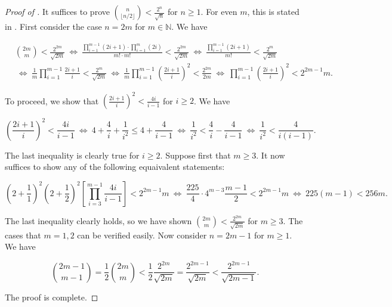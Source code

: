 \documentclass{toc}
\begin{document}
\begin{proof}[Proof of ]
				It suffices to prove $\binom{n}{\lfloor n/2 \rfloor} < \frac{2^n}{\sqrt{n}}$ for $n \ge 1$.
				For even $m$, this is stated in \cite[2.6.2 Proposition]{invitation}.
				First consider the case $n = 2m$ for $m\in \mathbb{N}$. We have
				\begin{linenomath}\begin{equation*}
						\begin{aligned}
							& \binom{2m}{m} < \frac{2^{2m}}{\sqrt{2m}}
							~\iff~ \frac{\prod_{i=1}^{m-1} (2i + 1) \cdot \prod_{i=1}^m (2i)}{m!\cdot m!} < \frac{2^{2m}}{\sqrt{2m}}
							~\iff~ \frac{\prod_{i=1}^{m-1} (2i + 1)}{m!} < \frac{2^m}{\sqrt{2m}} \\
							& ~\iff~ \frac{1}{m} \prod_{i=1}^{m-1} \frac{2i + 1}{i} < \frac{2^m}{\sqrt{2m}}
							~\iff~ \frac{1}{m}\prod_{i=1}^{m-1} \left(\frac{2i + 1}{i}\right)^2 < \frac{2^{2m}}{2m}
							~\iff~ \prod_{i=1}^{m-1} \left(\frac{2i + 1}{i}\right)^2 < 2^{2m - 1}m.
						\end{aligned}
				\end{equation*}\end{linenomath}
				To proceed, we show that $\left(\frac{2i + 1}{i}\right)^2 < \frac{4i}{i - 1}$ for $i \ge 2$.
				We have
				\begin{linenomath}\begin{equation*}
						\left(\frac{2i + 1}{i}\right)^2 < \frac{4i}{i - 1}
						~\iff~ 4 + \frac{4}{i} + \frac{1}{i^2} \le 4 + \frac{4}{i - 1}
						~\iff~ \frac{1}{i^2} < \frac{4}{i} - \frac{4}{i - 1}
						~\iff~ \frac{1}{i^2} < \frac{4}{i(i - 1)}.
				\end{equation*}\end{linenomath}
				The last inequality is clearly true for $i\ge 2$.
				Suppose first that $m \ge 3$.
				It now suffices to show %
				any of the following equaivalent statements:  %
				\begin{linenomath}\begin{equation*}
						\left(2 + \frac{1}{1}\right)^2 \left(2 + \frac{1}{2}\right)^2 \left[\prod_{i=3}^{m-1} \frac{4i}{i - 1}\right] < 2^{2m - 1}m
						~\iff~ \frac{225}{4}\cdot 4^{m-3}\frac{m-1}{2} < 2^{2m - 1}m
						~\iff~ 225(m - 1) < 256m.
				\end{equation*}\end{linenomath}
				The last inequality clearly holds, so we have shown $\binom{2m}{m} < \frac{2^{2m}}{\sqrt{2m}}$ for $m\ge 3$.
				The cases that $m = 1, 2$ can be verified easily.
				Now consider $n = 2m - 1$ for $m \ge 1$.
				We have
				\begin{linenomath}\begin{equation*}
						\binom{2m - 1}{m - 1} = \frac{1}{2} \binom{2m}{m} < \frac{1}{2} \frac{2^{2m}}{\sqrt{2m}}
						= \frac{2^{2m - 1}}{\sqrt{2m}} < \frac{2^{2m - 1}}{\sqrt{2m - 1}}.
				\end{equation*}\end{linenomath}
				The proof is complete.
			\end{proof}
			\fi  %
			
\end{document}
